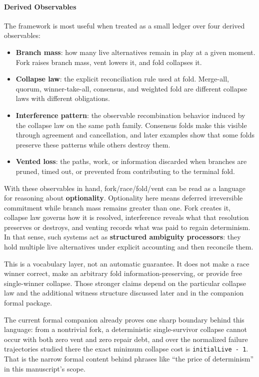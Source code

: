 \documentclass[
  11pt,
]{article}
\begin{document}
\paragraph{Derived Observables}\label{derived-observables}

The framework is most useful when treated as a small ledger over four
derived observables:

\begin{itemize}
\item
  \textbf{Branch mass}: how many live alternatives remain in play at a
  given moment. Fork raises branch mass, vent lowers it, and fold
  collapses it.
\item
  \textbf{Collapse law}: the explicit reconciliation rule used at fold.
  Merge-all, quorum, winner-take-all, consensus, and weighted fold are
  different collapse laws with different obligations.
\item
  \textbf{Interference pattern}: the observable recombination behavior
  induced by the collapse law on the same path family. Consensus folds
  make this visible through agreement and cancellation, and later
  examples show that some folds preserve these patterns while others
  destroy them.
\item
  \textbf{Vented loss}: the paths, work, or information discarded when
  branches are pruned, timed out, or prevented from contributing to the
  terminal fold.
\end{itemize}

With these observables in hand, fork/race/fold/vent can be read as a
language for reasoning about \textbf{optionality}. Optionality here
means deferred irreversible commitment while branch mass remains greater
than one. Fork creates it, collapse law governs how it is resolved,
interference reveals what that resolution preserves or destroys, and
venting records what was paid to regain determinism. In that sense, such
systems act as \textbf{structured ambiguity processors}: they hold
multiple live alternatives under explicit accounting and then reconcile
them.

This is a vocabulary layer, not an automatic guarantee. It does not make
a race winner correct, make an arbitrary fold information-preserving, or
provide free single-winner collapse. Those stronger claims depend on the
particular collapse law and the additional witness structure discussed
later and in the companion formal package.

The current formal companion already proves one sharp boundary behind
this language: from a nontrivial fork, a deterministic single-survivor
collapse cannot occur with both zero vent and zero repair debt, and over
the normalized failure trajectories studied there the exact minimum
collapse cost is \texttt{initialLive\ -\ 1}. That is the narrow formal
content behind phrases like ``the price of determinism'' in this
manuscript's scope.
\end{document}
